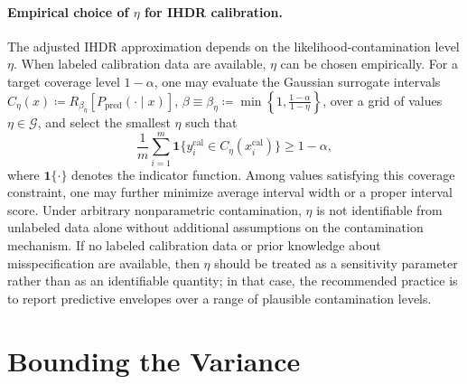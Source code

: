 \documentclass[12pt, english, oneside, a4paper]{article}
\begin{document}
\paragraph{Empirical choice of \(\eta\) for IHDR calibration.}
The adjusted IHDR approximation depends on the likelihood-contamination level \(\eta\). When labeled calibration data are available, \(\eta\) can be chosen empirically. For a target coverage level \(1-\alpha\), one may evaluate the Gaussian surrogate intervals
\(
C_{\eta}(x)
\coloneqq 
R_{\beta_{\eta}}\!\left[P_{\mathrm{pred}}(\cdot\mid x)\right] \), \(\beta \equiv \beta_{\eta}
\coloneqq 
\min\left\{1,\frac{1-\alpha}{1-\eta}\right\}
\), 
over a grid of values \(\eta\in\mathcal G\), and select the smallest \(\eta\) such that
\[
\frac{1}{m}\sum_{i=1}^{m}
\mathbf 1\{y_i^{\mathrm{cal}}\in C_{\eta}(x_i^{\mathrm{cal}})\}
\ge 1-\alpha,
\]
where $\mathbf 1\{\cdot \}$ denotes the indicator function. Among values satisfying this coverage constraint, one may further minimize average interval width or a proper interval score. Under arbitrary nonparametric contamination, \(\eta\) is not identifiable from unlabeled data alone without additional assumptions on the contamination mechanism. If no labeled calibration data or prior knowledge about misspecification are available, then \(\eta\) should be treated as a sensitivity parameter rather than as an identifiable quantity; in that case, the recommended practice is to report predictive envelopes over a range of plausible contamination levels.








\section{Bounding the Variance}\label{sec:variance}
\end{document}
